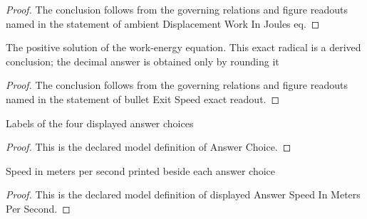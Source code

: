 \begin{proof}
  The conclusion follows from the governing relations and figure readouts named in the statement of ambient Displacement Work In Joules eq.
\end{proof}
\begin{lemma}
  \label{lem:physics:phyx-mini-0461:phyxminiproblems-problemphyxmini0461-bulletexitspeed-exact-readout}
  The positive solution of the work-energy equation. This exact radical is a derived conclusion; the decimal answer is obtained only by rounding it
\end{lemma}
\begin{proof}
  The conclusion follows from the governing relations and figure readouts named in the statement of bullet Exit Speed exact readout.
\end{proof}
\begin{definition}
  \label{def:physics:phyx-mini-0461:phyxminiproblems-problemphyxmini0461-answerchoice}
  Labels of the four displayed answer choices
\end{definition}
\begin{proof}
  This is the declared model definition of Answer Choice.
\end{proof}
\begin{definition}
  \label{def:physics:phyx-mini-0461:phyxminiproblems-problemphyxmini0461-displayedanswerspeedinmeterspersecond}
  Speed in meters per second printed beside each answer choice
\end{definition}
\begin{proof}
  This is the declared model definition of displayed Answer Speed In Meters Per Second.
\end{proof}
